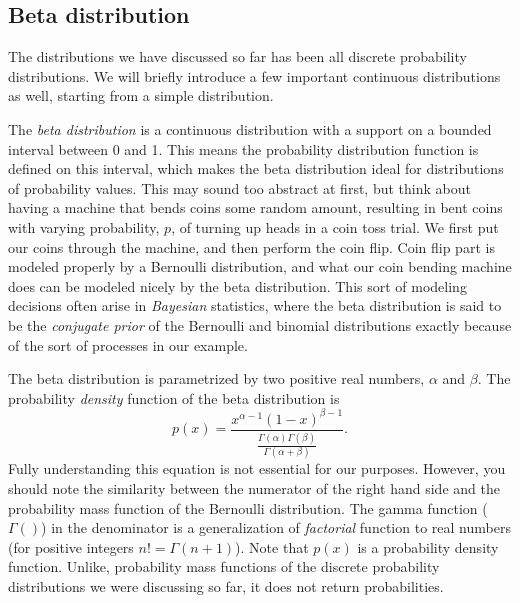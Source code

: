 \subsection{Beta distribution}

The distributions we have discussed so far has been
all discrete probability distributions.
We will briefly introduce a few important continuous distributions as well,
starting from a simple distribution.

The \emph{beta distribution} is a continuous distribution
with a support on a bounded interval between \num{0} and \num{1}. 
This means the probability distribution function is defined
on this interval,
which makes the beta distribution ideal for distributions of probability values.
This may sound too abstract at first,
but think about having a machine that bends coins some random amount,
resulting in bent coins with varying probability, $p$,
of turning up heads in a coin toss trial.
We first put our coins through the machine, and then perform the coin flip.
Coin flip part is modeled properly by a Bernoulli distribution,
and what our coin bending machine does can be modeled nicely
by the beta distribution.
This sort of modeling decisions often arise in \emph{Bayesian} statistics,
where the beta distribution is said to be
the \emph{conjugate prior} of the Bernoulli and binomial distributions
exactly because of the sort of processes in our example.

The beta distribution is parametrized by two positive real numbers,
$\alpha$ and $\beta$.
The probability \emph{density} function of the beta distribution is
\[
  p(x) = \frac{x^{\alpha-1} (1-x)^{\beta -1}}%
            {\frac{\Gamma(\alpha)\Gamma(\beta)}%
                  {\Gamma(\alpha+\beta)}
            }.
\]
Fully understanding this equation is not essential for our purposes.
However, you should note the similarity between
the numerator of the right hand side and
the probability mass function of the Bernoulli distribution.
The gamma function ($\Gamma()$) in the denominator is
a generalization of \emph{factorial} function to real numbers
(for positive integers $n! = \Gamma(n+1)$).
Note that $p(x)$ is a probability density function.
Unlike, probability mass functions of
the discrete probability distributions we were discussing so far, 
it does not return probabilities.

